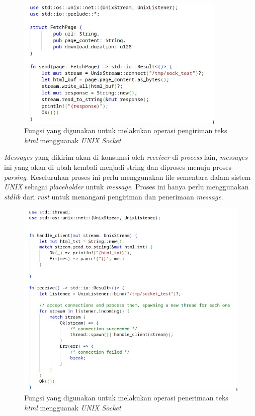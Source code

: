 \begin{figure}[H]
	\centering
	\includegraphics[keepaspectratio, width=10cm]{gambar/unix-sock-send-rs.png}
  \caption{Fungsi yang digunakan untuk melakukan operasi pengiriman teks \emph{html} mengguanak \emph{UNIX Socket}}
	\label{gambar:unix-socket-send}
\end{figure}

\emph{Messages} yang dikirim akan di-konsumsi oleh \emph{receiver} di \emph{process} lain, \emph{messages} ini yang akan di ubah kembali menjadi string dan diproses menuju proses \emph{parsing}. Keseluruhan proses ini perlu menggunakan file sementara dalam sistem \emph{UNIX} sebagai \emph{placeholder} untuk \emph{message}. Proses ini hanya perlu menggunakan \emph{stdlib} dari \emph{rust} untuk menangani pengiriman dan penerimaan \emph{message}.

\begin{figure}[H]
	\centering
	\includegraphics[keepaspectratio, width=12cm]{gambar/unix-sock-receive-rs.png}
  \caption{Fungsi yang digunakan untuk melakukan operasi penerimaan teks \emph{html} mengguanak \emph{UNIX Socket}}
	\label{gambar:unix-socket-receive}
\end{figure}



